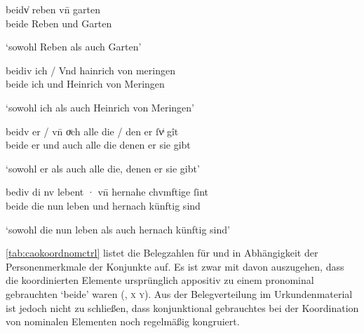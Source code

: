 \begin{exe}
\ex \label{ex:caokonj2ctrl}
	\begin{xlist}
	\ex \label{ex:caokonj2ctrl_1}
		\gll beidv̍ reben vn̄ garten \\
			beide Reben und Garten \\
		\begin{taggedline}{\parencites(Basel, 1296)[\pno~2353, 462.28--29]{cao3}}
		\trans `sowohl Reben als auch Garten'
		\end{taggedline}

	\ex \label{ex:caokonj2ctrl_2}
		\gll beidiv ich / Vnd hainrich von meringen \\
			beide ich {} und Heinrich von Meringen \\
		\begin{taggedline}{\parencites(Kl.~Steingaden, Kr.~Weilheim-Schongau, 1291)[\pno~1347, 578.25]{cao1}}
		\trans `sowohl ich als auch Heinrich von Meringen'
		\end{taggedline}

	\ex \label{ex:caokonj2ctrl_3}
		\gll beidv er / vn̄ oͮch alle die / den er ſvͥ gît \\
			beide er {} und auch alle die {} denen er sie gibt \\
		\begin{taggedline}{\parencites(Hüfingen, Schwarzwald-Baar-Kr., 1292)[\pno~1566, 717.18]{cao2}}
		\trans `sowohl er als auch alle die, denen er sie gibt'
		\end{taggedline}

	\ex \label{ex:caokonj2ctrl_4}
		\gll bediv di nv lebent · vn̄ hernahe chvmftige ſint \\
			beide die nun leben {} und hernach künftig sind \\
		\begin{taggedline}{\parencites(Wien, 1291)[\pno~1352, 580.8]{cao2}}
		\trans `sowohl die nun leben als auch hernach künftig sind'
		\end{taggedline}
	\end{xlist}
\end{exe}

\cref{tab:caokoordnomctrl} listet die Belegzahlen für  und
 in Abhängigkeit der Personenmerkmale der Konjunkte auf. Es ist
zwar mit \citet[626]{ksw2} davon auszugehen, dass die koordinierten Elemente
ursprünglich appositiv zu einem pronominal gebrauchten `beide' waren
(, \textsc{x}  \textsc{y}). Aus der Belegverteilung im
Urkundenmaterial ist jedoch nicht  zu schließen, dass konjunktional
gebrauchtes  bei der Koordination von nominalen Elementen noch
regelmäßig kongruiert.

